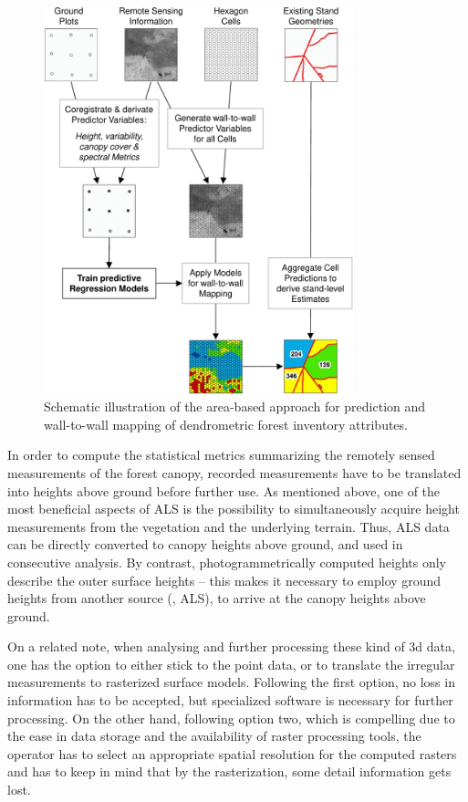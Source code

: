 \begin{figure}[bt]
	\centering
	\includegraphics[width=0.80\textwidth]{Figures/ABA_method/ABA_method_v3_crop}
	\caption[Schematic illustration of the area-based approach.]{Schematic illustration of the area-based approach for prediction 
		and wall-to-wall mapping of dendrometric forest inventory attributes.}
	\label{fig:ABA_method}
\end{figure}

  
 
In order to compute the statistical metrics summarizing the remotely sensed measurements of the forest canopy,
recorded measurements have to be translated into heights above ground before further use.
As mentioned above, one of the most beneficial aspects of \ac{ALS} is the possibility to simultaneously acquire height measurements 
from the vegetation and the underlying terrain. 
Thus, \ac{ALS} data can be directly converted to canopy heights above ground, and used in consecutive analysis.
By contrast, photogrammetrically computed heights only describe the outer surface heights -- this makes it necessary to employ 
ground heights from another source (\eg, \ac{ALS}), to arrive at the canopy heights above ground.

On a related note, when analysing and further processing these kind of 3d data, one has the option to either stick to the point data, 
or to translate the irregular measurements to rasterized surface models.
Following the first option, no loss in information has to be accepted, but specialized software is necessary for further processing.
On the other hand, following option two, which is compelling due to the ease in data storage and the availability of raster processing tools,
the operator has to select an appropriate spatial resolution for the computed rasters and has to keep in mind that by the rasterization, 
some detail information gets lost.


